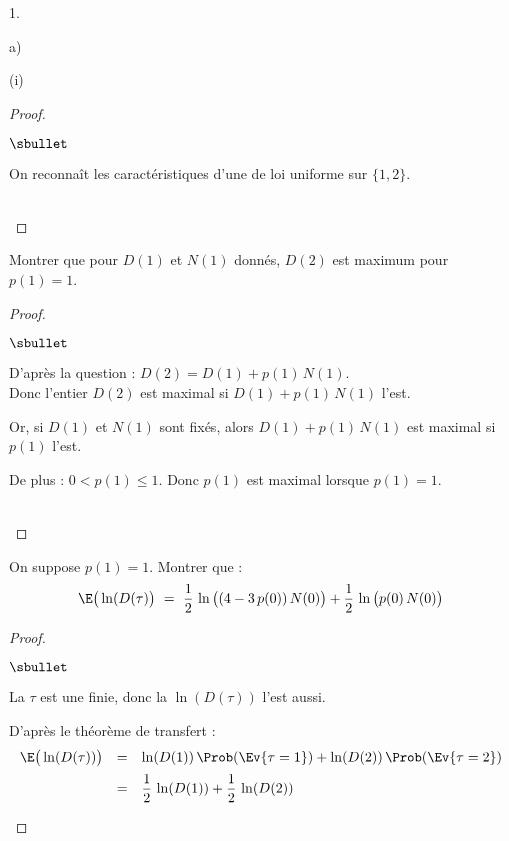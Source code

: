 \documentclass[11pt]{article}%
\begin{document}
\begin{noliste}{1.}
\begin{noliste}{a)}
\begin{nonoliste}{(i)}
\begin{proof}
\begin{noliste}{$\sbullet$}
	  \item On reconnaît les caractéristiques d'une \var de loi 
	  uniforme sur $\{1,2\}$.
        \end{noliste}
        ~\\[-1.2cm]
      \end{proof}
    \end{nonoliste}
    
    \item Montrer que pour $D(1)$ et $N(1)$ donnés, $D(2)$ est maximum
    pour $p(1)=1$.
    
    \begin{proof}~
     \begin{noliste}{$\sbullet$}
      \item D'après la question  : $D(2) = D(1) + p(1) \, 
      N(1)$.\\
      Donc l'entier $D(2)$ est maximal si $D(1)+p(1) \, N(1)$ l'est.
      
      \item Or, si $D(1)$ et $N(1)$ sont fixés, alors $D(1)+p(1) \, 
      N(1)$ est maximal si $p(1)$ l'est.
      
      \item De plus : $0< p(1) \leq 1$. Donc $p(1)$ est maximal 
      lorsque $p(1)=1$.
     \end{noliste}
     ~\\[-1cm]
    \end{proof}

    
    \item On suppose $p(1)=1$. Montrer que :
    \[
      \E\big(\ln(D(\tau)\big) \ = \ \dfrac{1}{2} \, \ln\big((4-3 \, 
      p(0)) \, N(0)\big) + \dfrac{1}{2} \, \ln\big(p(0) \, N(0)\big)
    \]
    
    \begin{proof}~
      \begin{noliste}{$\sbullet$}
	\item La \var $\tau$ est une \var finie, donc la \var $\ln(
	D(\tau))$ l'est aussi.
	
	\item D'après le théorème de transfert :
	\[
	  \begin{array}{rcl}
	    \E\big(\ln(D(\tau))\big) &=& \ln(D(1)) \, \Prob(\Ev{\tau
	    =1}) + \ln(D(2)) \, \Prob(\Ev{\tau =2})
	    \\[.2cm]
	    &=& \dfrac{1}{2} \, \ln(D(1)) + \dfrac{1}{2} \, \ln(D(2))
	  \end{array}
	\]
	

\end{noliste}
\end{proof}
\end{noliste}
\end{noliste}
\end{document}
